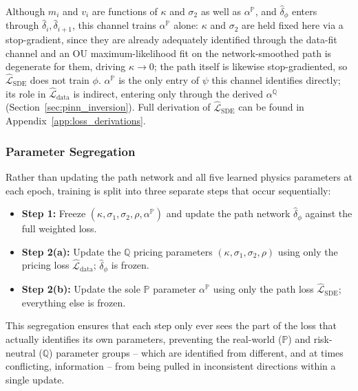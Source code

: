\documentclass[11pt, a4paper]{article}
\begin{document}
Although $m_i$ and $v_i$ are functions of $\kappa$ and $\sigma_2$ as well as
$\alpha^{\mathbb{P}}$, and $\hat\delta_\phi$ enters through $\hat\delta_i,
\hat\delta_{i+1}$, this channel trains $\alpha^{\mathbb{P}}$ alone: $\kappa$
and $\sigma_2$ are held fixed here via a stop-gradient, since they are
already adequately identified through the data-fit channel and an OU
maximum-likelihood fit on the network-smoothed path is degenerate for them,
driving $\kappa \to 0$; the path itself is likewise stop-gradiented, so
$\hat{\mathcal{L}}_{\text{SDE}}$ does not train $\phi$. $\alpha^{\mathbb{P}}$
is the only entry of $\psi$ this channel identifies directly; its role in
$\hat{\mathcal{L}}_{\text{data}}$ is indirect, entering only through the
derived $\alpha^{\mathbb{Q}}$ (Section~\ref{sec:pinn_inversion}). Full derivation of $\hat{\mathcal{L}}_{\text{SDE}}$ can be found in Appendix~\ref{app:loss_derivations}. %

\subsubsection*{Parameter Segregation}
\label{sec:alternating}

Rather than updating the path network and all five learned physics
parameters at each epoch, training is split into three separate steps that
occur sequentially:
\begin{itemize}
    \item \textbf{Step 1:} Freeze $(\kappa, \sigma_1, \sigma_2, \rho,
    \alpha^{\mathbb{P}})$ and update the path network $\hat{\delta}_{\phi}$
    against the full weighted loss.
    \item \textbf{Step 2(a):} Update the $\mathbb{Q}$ pricing parameters
    $(\kappa, \sigma_1, \sigma_2, \rho)$ using only the pricing loss
    $\hat{\mathcal{L}}_{\text{data}}$; $\hat{\delta}_{\phi}$ is frozen.
    \item \textbf{Step 2(b):} Update the sole $\mathbb{P}$ parameter
    $\alpha^{\mathbb{P}}$ using only the path loss $\hat{\mathcal{L}}_{\text{SDE}}$;
    everything else is frozen.
\end{itemize}

This segregation ensures that each step only ever sees the part of the loss
that actually identifies its own parameters, preventing the real-world
($\mathbb{P}$) and risk-neutral ($\mathbb{Q}$) parameter groups -- which are
identified from different, and at times conflicting, information -- from
being pulled in inconsistent directions within a single update.
\end{document}
